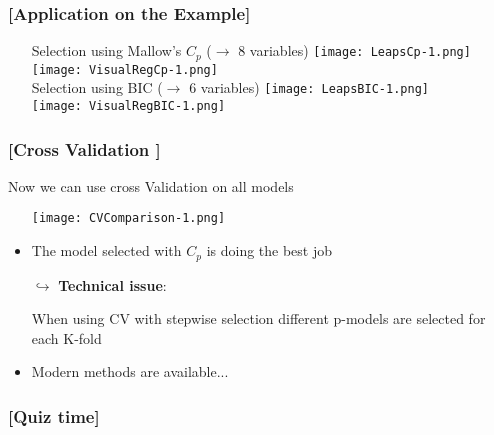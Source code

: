 \documentclass[xcolor=x11names,compress, handhouts]{beamer}
\renewcommand{\(}{\begin{columns}}
\renewcommand{\)}{\end{columns}}
\newcommand{\<}[1]{\begin{column}{#1}}
\renewcommand{\>}{\end{column}}
\begin{document}
\begin{frame} %
\frametitle{\textcolor{brique}{[Application on the Example]}}
\pause
\begin{itemize}
  \item[]
   {Selection using Mallow's $C_p$ ($\rightarrow $ 8 variables) }
   { \texttt{[image: LeapsCp-1.png]} \\ }
   { \texttt{[image: VisualRegCp-1.png]} \\ }
   {Selection using BIC ($\rightarrow $ 6 variables) }
   { \texttt{[image: LeapsBIC-1.png]} \\ }
   { \texttt{[image: VisualRegBIC-1.png]} \\ }
\end{itemize}
\end{frame}

\begin{frame} %
\frametitle{\textcolor{brique}{[Cross Validation ]}}
Now we can use cross Validation on all  models
\pause
\begin{itemize}[<+->]
  \item[] \texttt{[image: CVComparison-1.png]}
  \item The model selected with $C_p$ is doing the best job
  \item[$\hookrightarrow$] \textbf{Technical issue}:
  \item[]  When using CV with stepwise selection different p-models are selected for each K-fold
  \item Modern methods are available...
\end{itemize}
\end{frame}


\begin{frame} %
\frametitle{\textcolor{brique}{[Quiz time]}}
\pause
\begin{itemize}[<+->]
  \item[]
\end{itemize}
\end{frame}
\end{document}
